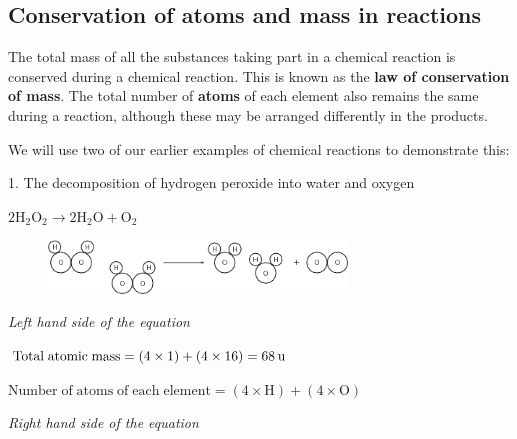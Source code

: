             \subsection{ Conservation of atoms and mass in reactions}
            \nopagebreak
      \label{m38711*id64489}The total mass of all the substances taking part in a chemical reaction is conserved during a chemical reaction. This is known as the \textbf{law of conservation of mass}. The total number of \textbf{atoms} of each element also remains the same during a reaction, although these may be arranged differently in the products.\par 
      \label{m38711*id64505}We will use two of our earlier examples of chemical reactions to demonstrate this:\par 
      \label{m38711*id64509}1. The decomposition of hydrogen peroxide into water and oxygen\par 
      \label{m38711*id64513}$2{\mathrm{H}}_{2}{\mathrm{O}}_{2}\to 2\mathrm{H}{}_{2}\mathrm{O}+{\mathrm{O}}_{2}$
      \par 
      \label{m38711*id64563}
    \setcounter{subfigure}{0}
	\begin{figure}[H] %
    \begin{center}
    \label{m38711*id64566!!!underscore!!!media}\label{m38711*id64566!!!underscore!!!printimage}\includegraphics[width=300px]{col11305.imgs/m38711_CG10C4_007.png} %
      \vspace{2pt}
    \vspace{.1in}
    \end{center}
 \end{figure}       
      \par 
      \label{m38711*id64573}
        \textsl{Left hand side of the equation}
      \par 
      \label{m38711*id64579}$\mathrm{Total\; atomic\; mass}=\left(4\ensuremath{\times}1\right)+\left(4\ensuremath{\times}16\right)=68\phantom{\rule{2pt}{0ex}}\mathrm{u}$\par 
      \label{m38711*id64601}$\mathrm{Number\; of\; atoms\; of\; each\; element}=\left(4\ensuremath{\times}\mathrm{H}\right)+\left(4\ensuremath{\times}\mathrm{O}\right)$\par 
      \label{m38711*id64623}
        \textsl{Right hand side of the equation}
